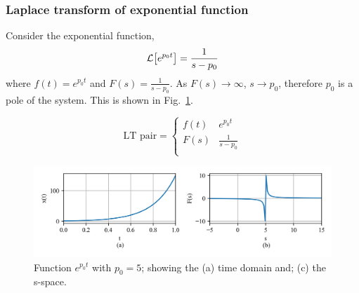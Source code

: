 \documentclass[12pt,letter]{article}
\begin{document}
		\subsubsection{Laplace transform of exponential function}

		Consider the exponential function,
		\begin{equation}
		\mathcal{L}{\left[e^{p_0t}\right]} = \frac{1}{s -p_0} 
		\end{equation}
		where
		$f(t) = e^{p_0t}$ and $F(s) = \frac{1}{s -p_0} $. As $F(s) \rightarrow \infty $, $s \rightarrow p_0$, therefore $p_0$ is a pole of the system. This is shown in Fig.~\ref{fig:S_space_exp_pt}.	

		\begin{equation}
		\text{LT pair} =
			\begin{cases}
			f(t) & e^{p_0t} \\
			F(s) & \frac{1}{s -p_0} \\
			\end{cases}
		\end{equation}

	
		\begin{figure}[H]
			\centering
			\includegraphics[width=6.5in]{../figures/T_and_S_space_exponential_function.png}
			\caption{Function $e^{p_0t}$ with $p_0=5$; showing the (a) time domain and; (c) the s-space.}
			\label{fig:S_space_exp_pt}
		\end{figure}
\end{document}

